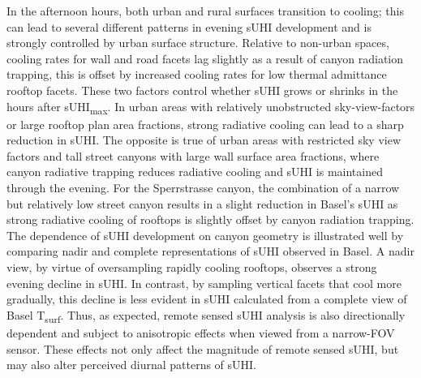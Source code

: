 \begin{bibunit}
In the afternoon hours, both urban and rural surfaces transition to cooling; this can lead to several different patterns in evening sUHI development and is strongly controlled by urban surface structure. Relative to non-urban spaces, cooling rates for wall and road facets lag slightly as a result of canyon radiation trapping, this is offset by increased cooling rates for low thermal admittance rooftop facets. These two factors control whether sUHI grows or shrinks in the hours after sUHI\textsubscript{max}. In urban areas with relatively unobstructed sky-view-factors or large rooftop plan area fractions, strong radiative cooling can lead to a sharp reduction in sUHI. The opposite is true of urban areas with restricted sky view factors and tall street canyons with large wall surface area fractions, where canyon radiative trapping reduces radiative cooling and sUHI is maintained through the evening. For the Sperrstrasse canyon, the combination of a narrow but relatively low street canyon results in a slight reduction in Basel's sUHI as strong radiative cooling of rooftops is slightly offset by canyon radiation trapping. The dependence of sUHI development on canyon geometry is illustrated well by comparing nadir and complete representations of sUHI observed in Basel. A nadir view, by virtue of oversampling rapidly cooling rooftops, observes a strong evening decline in sUHI. In contrast, by sampling vertical facets that cool more gradually, this decline is less evident in sUHI calculated from a complete view of Basel T\textsubscript{surf}. Thus, as expected, remote sensed sUHI analysis is also directionally dependent and subject to anisotropic effects when viewed from a narrow-FOV sensor. These effects not only affect the magnitude of remote sensed sUHI, but may also alter perceived diurnal patterns of sUHI. 
 

\end{bibunit}
